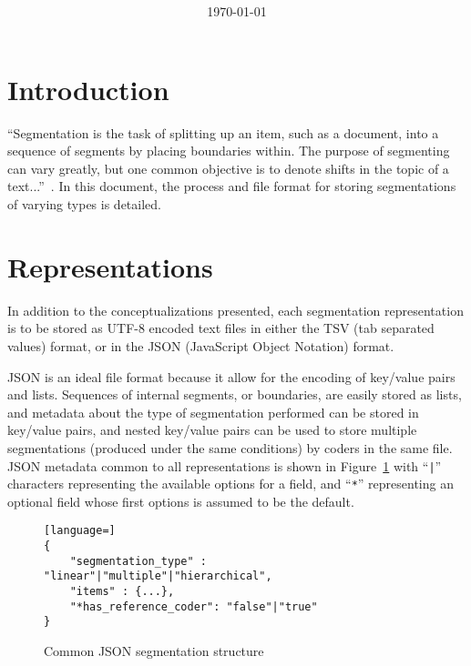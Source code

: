 \documentclass{article}
\begin{document}
\title{\pdftitle
\\
{\large \pdfversion}}
\author{\pdfauthors}
\date{\today}
\maketitle



\section{Introduction}
``Segmentation is the task of splitting up an item, such as a document,
into a sequence of segments by placing boundaries within. The purpose of
segmenting can vary greatly, but one common objective is to denote shifts in the
topic of a text...''~\citep{FournierInkpen2012}.  In this document, the process
and file format for storing segmentations of varying types is detailed.



\section{Representations}
In addition to the conceptualizations presented, each segmentation
representation is to be stored  as UTF-8 encoded text files in either the TSV
(tab separated values) format, or in the JSON (JavaScript Object Notation)
format.  

JSON is an ideal file format because it allow for the encoding of key/value
pairs and lists.  Sequences of internal segments, or boundaries, are easily
stored as lists, and metadata about the type of segmentation performed can be
stored in key/value pairs, and nested key/value pairs can be used to store
multiple segmentations (produced under the same conditions) by coders in the
same file.  JSON metadata common to all representations is shown in
Figure~\ref{fig:json} with ``\verb+|+'' characters representing the available
options for a field, and ``\verb+*+'' representing an optional field whose
first options is assumed to be the default.

\begin{figure}[h]
\begin{lstlisting}[language=]
{
	"segmentation_type" : "linear"|"multiple"|"hierarchical",
	"items" : {...},
	"*has_reference_coder": "false"|"true"
}
\end{lstlisting}
\vspace{-3em}
\caption{Common JSON segmentation structure}
\label{fig:json}
\end{figure}
\end{document}
